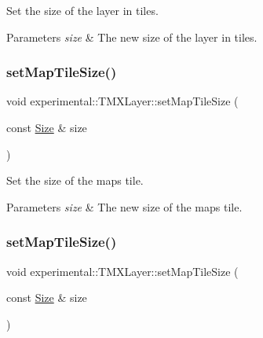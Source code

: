 Set the size of the layer in tiles.


\begin{DoxyParams}{Parameters}
{\em size} & The new size of the layer in tiles. \\
\hline
\end{DoxyParams}
\mbox{\label{classexperimental_1_1TMXLayer_afc37ac1e61919a58fca4dfaf8b6e950b}} 
\subsubsection{\texorpdfstring{set\+Map\+Tile\+Size()}{setMapTileSize()}\hspace{0.1cm}{\footnotesize\ttfamily [1/2]}}
{\footnotesize\ttfamily void experimental\+::\+T\+M\+X\+Layer\+::set\+Map\+Tile\+Size (\begin{DoxyParamCaption}\item[{const \hyperlink{classSize}{Size} \&}]{size }\end{DoxyParamCaption})\hspace{0.3cm}{\ttfamily [inline]}}

Set the size of the map\textquotesingle{}s tile.


\begin{DoxyParams}{Parameters}
{\em size} & The new size of the map\textquotesingle{}s tile. \\
\hline
\end{DoxyParams}
\mbox{\label{classexperimental_1_1TMXLayer_afc37ac1e61919a58fca4dfaf8b6e950b}} 
\subsubsection{\texorpdfstring{set\+Map\+Tile\+Size()}{setMapTileSize()}\hspace{0.1cm}{\footnotesize\ttfamily [2/2]}}
{\footnotesize\ttfamily void experimental\+::\+T\+M\+X\+Layer\+::set\+Map\+Tile\+Size (\begin{DoxyParamCaption}\item[{const \hyperlink{classSize}{Size} \&}]{size }\end{DoxyParamCaption})\hspace{0.3cm}{\ttfamily [inline]}}

